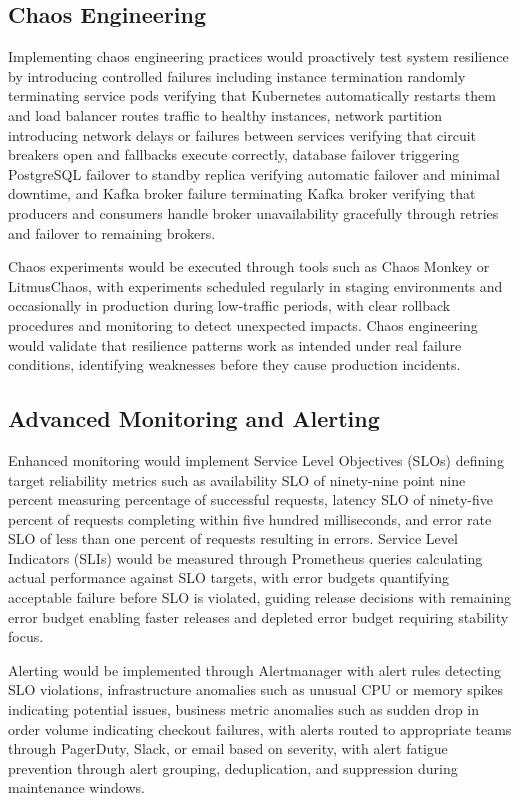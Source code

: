 \subsection{Chaos Engineering}

Implementing chaos engineering practices would proactively test system resilience by introducing controlled failures including instance termination randomly terminating service pods verifying that Kubernetes automatically restarts them and load balancer routes traffic to healthy instances, network partition introducing network delays or failures between services verifying that circuit breakers open and fallbacks execute correctly, database failover triggering PostgreSQL failover to standby replica verifying automatic failover and minimal downtime, and Kafka broker failure terminating Kafka broker verifying that producers and consumers handle broker unavailability gracefully through retries and failover to remaining brokers.

Chaos experiments would be executed through tools such as Chaos Monkey or LitmusChaos, with experiments scheduled regularly in staging environments and occasionally in production during low-traffic periods, with clear rollback procedures and monitoring to detect unexpected impacts. Chaos engineering would validate that resilience patterns work as intended under real failure conditions, identifying weaknesses before they cause production incidents.

\subsection{Advanced Monitoring and Alerting}

Enhanced monitoring would implement Service Level Objectives (SLOs) defining target reliability metrics such as availability SLO of ninety-nine point nine percent measuring percentage of successful requests, latency SLO of ninety-five percent of requests completing within five hundred milliseconds, and error rate SLO of less than one percent of requests resulting in errors. Service Level Indicators (SLIs) would be measured through Prometheus queries calculating actual performance against SLO targets, with error budgets quantifying acceptable failure before SLO is violated, guiding release decisions with remaining error budget enabling faster releases and depleted error budget requiring stability focus.

Alerting would be implemented through Alertmanager with alert rules detecting SLO violations, infrastructure anomalies such as unusual CPU or memory spikes indicating potential issues, business metric anomalies such as sudden drop in order volume indicating checkout failures, with alerts routed to appropriate teams through PagerDuty, Slack, or email based on severity, with alert fatigue prevention through alert grouping, deduplication, and suppression during maintenance windows.

